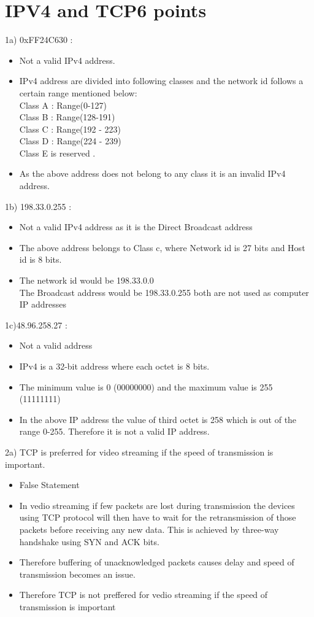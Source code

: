 \documentclass{resources/WeSTassignment}
\begin{document}
\section{IPV4 and TCP\hfill{6 points}}
1a) 0xFF24C630 :  
\begin{itemize}
               \item Not a valid IPv4 address.
               \item IPv4 address are divided into following classes and the network id follows a certain range mentioned below: \\ Class A : Range(0-127)\\ Class B : Range(128-191) \\ Class C : Range(192 - 223) \\ Class D : Range(224 - 239) \\ Class E is reserved .
               \item As the above address does not belong to any class it is an invalid IPv4 address.
            \end{itemize}
1b) 198.33.0.255 :
            \begin{itemize}
			\item Not a valid IPv4 address as it is the Direct Broadcast address
            \item The above address belongs to Class c, where Network id is 27 bits and Host id is 8 bits.
            \item The network id would be 198.33.0.0\\The Broadcast address would be 198.33.0.255 both are not used as computer IP addresses
            \end{itemize}
1c)48.96.258.27 :
            \begin{itemize}
            \item  Not a valid address
            \item IPv4 is a 32-bit address where each octet is 8 bits.
            \item The minimum value is 0 (00000000) and the maximum value is 255 (11111111)
            \item In the above IP address the value of third octet is 258 which is out of the range 0-255. Therefore it is not a valid IP address.
            \end{itemize}
2a) TCP is preferred for video streaming if the speed of transmission is important.
			\begin{itemize}
			\item False Statement
			\item In vedio streaming if few packets are lost during transmission the devices using TCP protocol will then have to wait for the retransmission of those packets before receiving any new data. This is achieved by three-way handshake using SYN and ACK bits.
			\item Therefore buffering of unacknowledged packets causes delay and speed of transmission becomes an issue.
			\item Therefore TCP is not preffered for vedio streaming if the speed of transmission is important
			\end{itemize}
\end{document}
